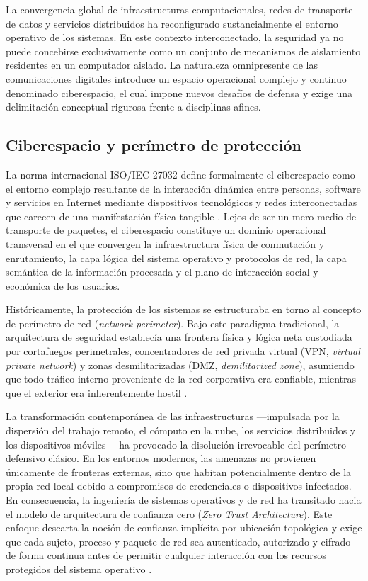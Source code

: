\documentclass[12pt]{article}
\begin{document}
La convergencia global de infraestructuras computacionales, redes de transporte de datos y servicios distribuidos ha reconfigurado sustancialmente el entorno operativo de los sistemas. En este contexto interconectado, la seguridad ya no puede concebirse exclusivamente como un conjunto de mecanismos de aislamiento residentes en un computador aislado. La naturaleza omnipresente de las comunicaciones digitales introduce un espacio operacional complejo y continuo denominado ciberespacio, el cual impone nuevos desafíos de defensa y exige una delimitación conceptual rigurosa frente a disciplinas afines.

\subsection{Ciberespacio y perímetro de protección}\label{subsec:ciberespacioPerimetroProteccion}

La norma internacional ISO/IEC 27032 define formalmente el ciberespacio como el entorno complejo resultante de la interacción dinámica entre personas, software y servicios en Internet mediante dispositivos tecnológicos y redes interconectadas que carecen de una manifestación física tangible \parencite[\S 4.14, p.\ 3]{iso27032}. Lejos de ser un mero medio de transporte de paquetes, el ciberespacio constituye un dominio operacional transversal en el que convergen la infraestructura física de conmutación y enrutamiento, la capa lógica del sistema operativo y protocolos de red, la capa semántica de la información procesada y el plano de interacción social y económica de los usuarios.

Históricamente, la protección de los sistemas se estructuraba en torno al concepto de perímetro de red (\textit{network perimeter}). Bajo este paradigma tradicional, la arquitectura de seguridad establecía una frontera física y lógica neta custodiada por cortafuegos perimetrales, concentradores de red privada virtual (VPN, \textit{virtual private network}) y zonas desmilitarizadas (DMZ, \textit{demilitarized zone}), asumiendo que todo tráfico interno proveniente de la red corporativa era confiable, mientras que el exterior era inherentemente hostil \parencite[\S 19.6.1, p.\ 939]{deitel2004operating}.

La transformación contemporánea de las infraestructuras ---impulsada por la dispersión del trabajo remoto, el cómputo en la nube, los servicios distribuidos y los dispositivos móviles--- ha provocado la disolución irrevocable del perímetro defensivo clásico. En los entornos modernos, las amenazas no provienen únicamente de fronteras externas, sino que habitan potencialmente dentro de la propia red local debido a compromisos de credenciales o dispositivos infectados. En consecuencia, la ingeniería de sistemas operativos y de red ha transitado hacia el modelo de arquitectura de confianza cero (\textit{Zero Trust Architecture}). Este enfoque descarta la noción de confianza implícita por ubicación topológica y exige que cada sujeto, proceso y paquete de red sea autenticado, autorizado y cifrado de forma continua antes de permitir cualquier interacción con los recursos protegidos del sistema operativo \parencite[\S 15.5, p.\ 681]{stallings2018operating}.
\end{document}

